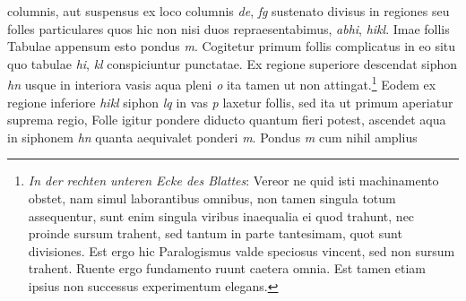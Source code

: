       columnis, aut suspensus ex loco columnis \textit{de}, \textit{fg} sustenato divisus  in regiones seu folles particulares quos hic non nisi duos repraesentabimus, \textit{abhi}, \textit{hikl}. Imae follis Tabulae  appensum esto pondus \textit{m}. Cogitetur primum  follis complicatus in eo situ quo tabulae \textit{hi}, \textit{kl} conspiciuntur punctatae. Ex regione superiore  descendat siphon\protect{} \textit{hn} usque in interiora vasis aqua pleni \textit{o} ita tamen ut  non attingat.\footnote{\textit{In der rechten unteren Ecke des Blattes}: Vereor ne quid isti machinamento obstet, nam simul laborantibus omnibus, non tamen singula totum assequentur, sunt enim singula viribus inaequalia ei quod trahunt, nec proinde sursum trahent, sed tantum in parte tantesimam, quot sunt divisiones. Est ergo hic Paralogismus valde speciosus vincent, sed non sursum trahent. Ruente ergo fundamento ruunt caetera omnia. Est tamen etiam ipsius non successus experimentum elegans.} Eodem  ex regione inferiore \textit{hikl} siphon\protect{} \textit{lq} in vas \textit{p} laxetur follis, sed ita ut primum aperiatur suprema regio, Folle igitur pondere diducto quantum fieri potest, ascendet aqua in siphonem\protect{} \textit{hn} quanta aequivalet ponderi \textit{m}. Pondus \textit{m} cum nihil amplius 